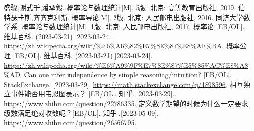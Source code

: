 \begin{thebibliography}{99}%
     盛骤,谢式千,潘承毅. 概率论与数理统计[M]. 5版. 北京: 高等教育出版社, 2019.
     伯特瑟卡斯,齐齐克利斯. 概率导论[M]. 2版. 北京: 人民邮电出版社, 2016.
     同济大学数学系. 概率论与数理统计[M]. 1版. 北京: 人民邮电出版社, 2017.
     概率论 [EB/OL]. 维基百科. (2023-03-21) [2023-03-24]. \\\url{https://zh.wikipedia.org/wiki/%E6%A6%82%E7%8E%87%E8%AE%BA}.
     概率公理 [EB/OL]. 维基百科. (2023-03-21) [2023-03-24]. \\\url{https://zh.wikipedia.org/wiki/%E6%A9%9F%E7%8E%87%E5%85%AC%E8%A8%AD}.
     Can one infer independence by simple reasoning/intuition? [EB/OL]. StackExchange. [2023-03-29]. \url{https://math.stackexchange.com/q/1898596}.
     相互独立事件能否用韦恩图表示？ [EB/OL]. 知乎. [2023-03-29]. \\\url{https://www.zhihu.com/question/22786335}.
     定义数学期望的时候为什么一定要求级数满足绝对收敛呢？[EB/OL]. 知乎 .[2023-05-09]. \\\url{https://www.zhihu.com/question/26566795}.
\end{thebibliography}

